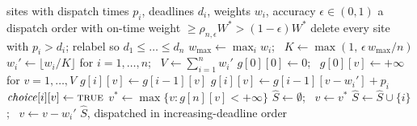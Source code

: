 \documentclass[pdflatex,sn-mathphys-ay]{sn-jnl}
\theoremstyle{thmstyleone}
\theoremstyle{thmstyletwo}
\theoremstyle{thmstylethree}
\providecommand{\DIFaddbegin}{} %
\providecommand{\DIFaddend}{} %
\providecommand{\DIFdelbegin}{} %
\providecommand{\DIFdelend}{} %
\newcommand{\DIFscaledelfig}{0.5}
\newlength{\DIFdelgraphicswidth} %
\newlength{\DIFdelgraphicsheight} %
\newcommand{\DIFaddincludegraphics}[2][]{{\color{blue}\fbox{\DIFOincludegraphics[#1]{#2}}}} %
\newcommand{\DIFdelincludegraphics}[2][]{%
\sbox{\DIFdelgraphicsbox}{\DIFOincludegraphics[#1]{#2}}%
\settoboxwidth{\DIFdelgraphicswidth}{\DIFdelgraphicsbox} %
\settoboxtotalheight{\DIFdelgraphicsheight}{\DIFdelgraphicsbox} %
\scalebox{\DIFscaledelfig}{%
\parbox[b]{\DIFdelgraphicswidth}{\usebox{\DIFdelgraphicsbox}\\[-\baselineskip] \rule{\DIFdelgraphicswidth}{0em}}\llap{\resizebox{\DIFdelgraphicswidth}{\DIFdelgraphicsheight}{%
\setlength{\unitlength}{\DIFdelgraphicswidth}%
\begin{picture}(1,1)%
\thicklines\linethickness{2pt} %
{\color[rgb]{1,0,0}\put(0,0){\framebox(1,1){}}}%
{\color[rgb]{1,0,0}\put(0,0){\line( 1,1){1}}}%
{\color[rgb]{1,0,0}\put(0,1){\line(1,-1){1}}}%
\end{picture}%
}\hspace*{3pt}}} %
} %
\DeclareRobustCommand{\DIFaddbegin}{\DIFOaddbegin \let\includegraphics\DIFaddincludegraphics} %
\DeclareRobustCommand{\DIFaddend}{\DIFOaddend \let\includegraphics\DIFOincludegraphics} %
\DeclareRobustCommand{\DIFdelbegin}{\DIFOdelbegin \let\includegraphics\DIFdelincludegraphics} %
\DeclareRobustCommand{\DIFdelend}{\DIFOaddend \let\includegraphics\DIFOincludegraphics} %
\begin{document}
\begin{algorithm}
\caption{FPTAS for MWHED (Theorem~\ref{thm:fptas})}\label{alg:fptas}
\DIFdelbegin %
\DIFdelend \DIFaddbegin \begin{algorithmic}[1]
\Require sites with dispatch times $p_i$, deadlines $d_i$, weights $w_i$, accuracy $\epsilon\in(0,1)$
\Ensure a dispatch order with on-time weight $\ge \rho_{n,\epsilon}W^\ast>(1-\epsilon)W^\ast$
\State delete every site with $p_i > d_i$; relabel so $d_1\le\dots\le d_n$
\State $w_{\max} \gets \max_i w_i$; \ $K \gets \max(1,\, \epsilon\, w_{\max}/n)$
\State $w_i' \gets \lfloor w_i/K \rfloor$ for $i=1,\dots,n$; \ $V \gets \sum_{i=1}^n w_i'$
\State $g[0][0] \gets 0$; \ $g[0][v] \gets +\infty$ for $v=1,\dots,V$
    \State $g[i][v] \gets g[i-1][v]$ 
        \State $g[i][v] \gets g[i-1][v-w_i'] + p_i$
        \State $\mathit{choice}[i][v] \gets \textsc{true}$
      \EndIf
    \EndIf
  \EndFor
\EndFor
\State $v^\ast \gets \max\{v : g[n][v] < +\infty\}$
\State $\hat S \gets \emptyset$; \ $v \gets v^\ast$
 
    \State $\hat S \gets \hat S \cup \{i\}$; \ $v \gets v - w_i'$
  \EndIf
\EndFor
\State \Return $\hat S$, dispatched in increasing-deadline order
\end{algorithmic}
\DIFaddend \end{algorithm}
\end{document}
